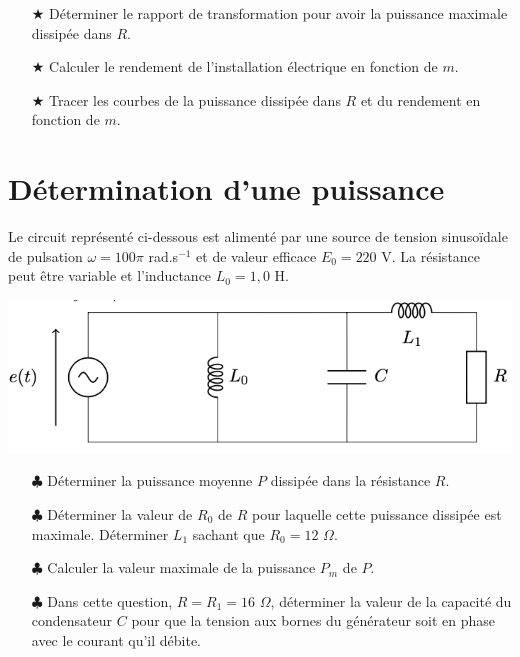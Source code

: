 \documentclass{report}
\begin{document}
\begin{itemize}
	\item[$\bigstar$] Déterminer le rapport de transformation pour avoir la puissance maximale dissipée dans $R$.
	\item[$\bigstar$] Calculer le rendement de l'installation électrique en fonction de $m$.
	\item[$\bigstar$] Tracer les courbes de la puissance dissipée dans $R$ et du rendement en fonction de $m$.
\end{itemize}

\newpage

\section*{Détermination d'une puissance}

Le circuit représenté ci-dessous est alimenté par une source de tension sinusoïdale de pulsation $\omega=100\pi$ rad.s$^{-1}$ et de valeur efficace $E_0=220$ V. La résistance peut être variable et l'inductance $L_0=1,0$ H.

\begin{center}
	\includegraphics[scale=0.9]{circuit.png}
\end{center}

\begin{itemize}

	\item[$\clubsuit$] Déterminer la puissance moyenne $P$ dissipée dans la résistance $R$.
	
	\item[$\clubsuit$]Déterminer la valeur de $R_0$ de $R$ pour laquelle cette puissance dissipée est maximale. Déterminer $L_1$ sachant que $R_0=12$ $\Omega$.
	
	\item[$\clubsuit$] Calculer la valeur maximale de la puissance $P_m$ de $P$.
	
	\item[$\clubsuit$]  Dans cette question, $R=R_1=16$ $\Omega$, déterminer la valeur de la capacité du condensateur $C$ pour que la tension aux bornes du générateur soit en phase avec le courant qu'il débite.  

\end{itemize}
\end{document}
